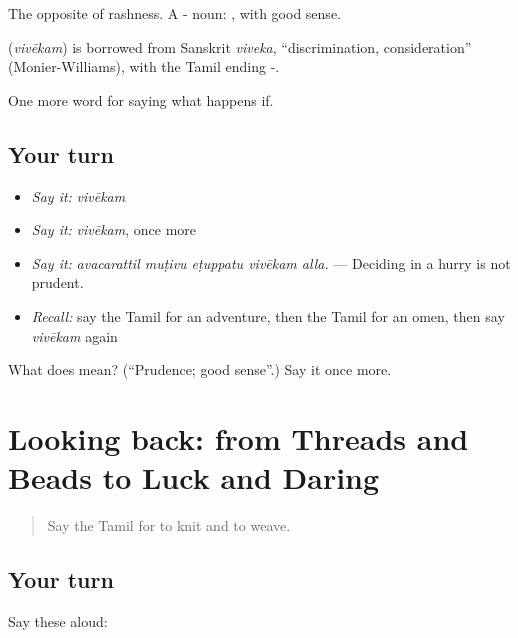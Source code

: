 The opposite of rashness. A - noun: , with good sense.

\begin{cousinweb}
\textbf{} (\emph{vivēkam}) is borrowed from Sanskrit \emph{viveka}, \textquotedblleft{}discrimination, consideration\textquotedblright{} (Monier-Williams), with the Tamil ending -.
\end{cousinweb}

\begin{grammarlens}[title={What you've built}]
One more word for saying what happens if.
\end{grammarlens}

\subsection*{Your turn}
\begin{itemize}
\raggedright
  \item \emph{Say it:} \emph{vivēkam}
  \item \emph{Say it:} \emph{vivēkam}, once more
  \item \emph{Say it:} \emph{avacarattil muṭivu eṭuppatu vivēkam alla.} — Deciding in a hurry is not prudent.
  \item \emph{Recall:} say the Tamil for an adventure, then the Tamil for an omen, then say \emph{vivēkam} again
\end{itemize}

\begin{tcolorbox}[breakable,colback=teal!4,colframe=teal!35!black,title={Before you move on}]
What does  mean? (\textquotedblleft{}Prudence; good sense\textquotedblright{}.) Say it once more.
\end{tcolorbox}
\section[(dialogue)]{Looking back: from Threads and Beads to Luck and Daring}

\label{lesson:TA-R544-review-538-544}



\begin{quote}
Say the Tamil for to knit and to weave.
\end{quote}

\subsection*{Your turn}
Say these aloud:

